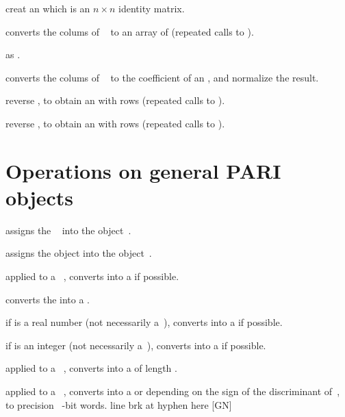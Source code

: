  creat an  which is an $n \times n$
identity matrix.

 converts the colums of
~ to an array of  (repeated calls to
).

 as .

 converts the colums of
~ to the coefficient of an , and normalize the
result.

 reverse , to obtain
an  with  rows (repeated calls to ).

 reverse , to obtain
an  with  rows (repeated calls to ).

\section{Operations on general PARI objects}


 assigns the ~ into the
object~.

 assigns the object  into the
object~.



 applied to a ~, converts 
into a  if possible.

 converts the   into a
.

 if  is a real number (not necessarily
a~), converts  into a  if possible.

 if  is an integer (not necessarily
a~), converts  into a  if possible.

 applied to a ~, converts
 into a  of length .

 applied to a ~, converts
 into a  or  depending on the sign of the
discriminant of~, to precision \hbox{ \B-bit} words.%
line brk at hyphen here [GN]

